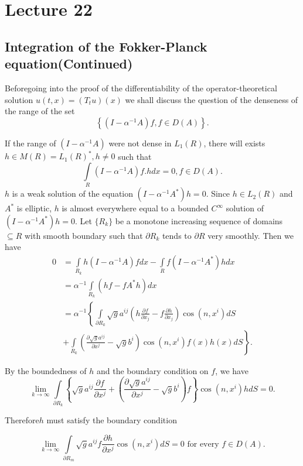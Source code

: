 \chapter{Lecture 22}\label{chap22} %

\section[Integration of the Fokker-Planck...]{Integration of the Fokker-Planck equation\hfill\break (Continued)}\label{chap22:sec1}

Before\pageoriginale going into the proof of the differentiability of the
operator-theo\-retical solution $u(t, x)=(T_t u)(x)$ we shall discuss
the question of the denseness of the range of the set 
$$
\left\{ (I- \alpha^{-1}A) f,f \in D(A) \right\}.
$$

If the range of $(I-\alpha^{-1}A)$ were not dense in $L_1 (R)$, there
will exists $h \in M(R)=L_1(R)^*,h\neq 0$ such that 
$$
\int \limits_R (I- \alpha^{-1}A)f. hdx=0, f\in D(A).
$$
$h$ is a weak solution of the equation $(I- \alpha^{-1}
A^*)h=0$. Since $h \in L_2 (R)$ and $A^*$ is elliptic, $h$ is almost
everywhere equal to a bounded $C^\infty$ solution of $(I-
\alpha^{-1}A^*)h=0$. Let $\{ R_k \}$ be a monotone increasing sequence
of domains $\subseteq R$ with smooth boundary such that $\partial R_k$ tends
to $\partial R$ very smoothly. Then we have 
\begin{align*}
 0 &= \int \limits_{R_k}h (I- \alpha^{-1}A) fdx- \int \limits_R f(I-
 \alpha^{-1}A^*)hdx\\ 
 &= \alpha^{-1}\int \limits_{R_k} (h f-f A^* h)dx\\
 &= \alpha^{-1} \left\{ \int \limits_{\partial R_k} \sqrt{g} a^{ij} \left(h
 \frac{\partial f}{\partial x_j}-f \frac{\partial h}{\partial x_j}\right)
 \cos (n,x^i)dS\right.\\ 
 & \left.+ \int \limits_{R_k} \left(\frac{\partial \sqrt{g}a^{ij}}{\partial
  x^j}-\sqrt{g}b^i\right) \cos (n,x^i) f(x)h(x)dS \right\}. 
\end{align*}

By the boundedness of $h$ and the boundary condition on $f$, we have
$$
\lim_{k \to \infty} \int \limits_{\partial R_k} \left\{ \sqrt {g} a^{ij}
\frac{\partial f}{\partial x^j}+ \left(\frac{\partial
 \sqrt{g}a^{ij}}{\partial x^j}- \sqrt{g}b^i\right)f\right\} \cos
(n,x^i)hd S=0. 
$$

Therefore\pageoriginale $h$ must satisfy the boundary condition

$$
\lim_{k \to \infty} \int \limits_{\partial R_m} \sqrt{g} a^{ij} f
\frac{\partial h}{\partial x^j} \cos (n,x^i) d S=0 \text{ for every }
f \in D(A). 
$$

